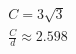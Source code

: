 \documentclass[preview]{standalone}
\begin{document}
\begin{align*}
C = 3\sqrt{3} \\\frac{C}{d} \approx 2.598
\end{align*}
\end{document}
